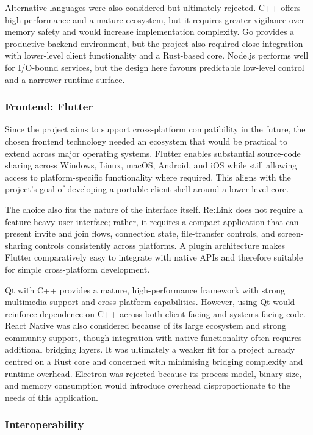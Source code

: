 \documentclass[12pt,a4paper]{article}
\begin{document}
Alternative languages were also considered but ultimately rejected. C++ offers high performance and a mature ecosystem, but it requires greater vigilance over memory safety and would increase implementation complexity. Go provides a productive backend environment, but the project also required close integration with lower-level client functionality and a Rust-based core. Node.js performs well for I/O-bound services, but the design here favours predictable low-level control and a narrower runtime surface.

\subsubsection{Frontend: Flutter}

Since the project aims to support cross-platform compatibility in the future, the chosen frontend technology needed an ecosystem that would be practical to extend across major operating systems. Flutter enables substantial source-code sharing across Windows, Linux, macOS, Android, and iOS while still allowing access to platform-specific functionality where required. This aligns with the project’s goal of developing a portable client shell around a lower-level core.

The choice also fits the nature of the interface itself. Re:Link does not require a feature-heavy user interface; rather, it requires a compact application that can present invite and join flows, connection state, file-transfer controls, and screen-sharing controls consistently across platforms. A plugin architecture makes Flutter comparatively easy to integrate with native APIs and therefore suitable for simple cross-platform development.

Qt with C++ provides a mature, high-performance framework with strong multimedia support and cross-platform capabilities. However, using Qt would reinforce dependence on C++ across both client-facing and systems-facing code. React Native was also considered because of its large ecosystem and strong community support, though integration with native functionality often requires additional bridging layers. It was ultimately a weaker fit for a project already centred on a Rust core and concerned with minimising bridging complexity and runtime overhead. Electron was rejected because its process model, binary size, and memory consumption would introduce overhead disproportionate to the needs of this application.

\subsubsection{Interoperability}
\end{document}
